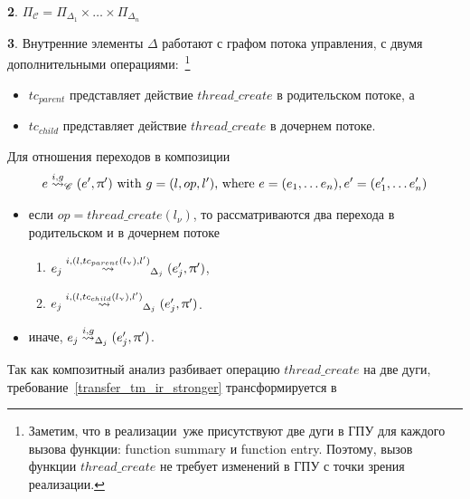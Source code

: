 {\textbf 2.} $\Pi_{\mathscr{C}} = \Pi_{\Delta_1} \times \dots \times \Pi_{\Delta_n}$

{\textbf 3.}
Внутренние элементы $\Delta$ работают с графом потока управления, с двумя дополнительными операциями:~\footnote{Заметим, что в реализации\cpachecker\ уже присутствуют две дуги в ГПУ для каждого вызова функции: function summary и function entry. Поэтому, вызов функции $thread\_create$ не требует изменений в ГПУ с точки зрения реализации.}
\begin{itemize}
\item $tc_{parent}$ представляет действие $thread\_create$ в родительском потоке, а
\item $tc_{child}$ представляет действие $thread\_create$ в дочернем потоке.
\end{itemize}

Для отношения переходов в композиции
\begin{equation}
\label{composite_transfer_eq}
\begin{aligned}
e \stackrel{i,g}{\leadsto}_{\mathscr{C}} (e',\uppi') \mbox{ with } g=(l,op,l' )\mbox{, where } e = (e_1, \dots e_n), e' = (e_1', \dots e_n')
\end{aligned}
\end{equation} 

\begin{itemize}
\item если $op=thread\_create(l_\nu)$, то рассматриваются два перехода в родительском и в дочернем потоке
\begin{enumerate}
\item $e_j \stackrel{i,(l,tc_{parent}(l_\upnu),l')}{\leadsto}_{\Delta_j} (e_j',\uppi')$,
\item $e_j \stackrel{i,(l,tc_{child}(l_\upnu),l')}{\leadsto}_{\Delta_j} (e_j',\uppi')$.
\end{enumerate}
\item иначе, $e_j \stackrel{i,g}{\leadsto}_{\Delta_j} (e_j',\uppi')$.
\end{itemize}


Так как композитный анализ разбивает операцию $thread\_create$ на две дуги, требование~\ref{transfer_tm_ir_stronger} трансформируется в

